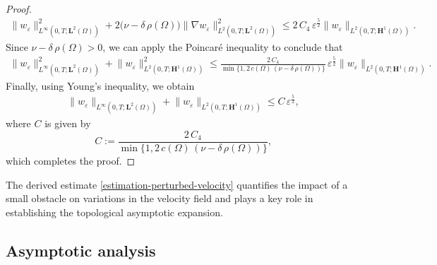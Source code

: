\documentclass[a4paper,12pt,reqno,natbib]{amsart}
\def\H{\textbf{H}}
\def\L{\textbf{L}}
\begin{document}
\begin{proof}
\begin{align*}
    \big\|w_\varepsilon\big\|^2_{L^\infty(0,T;\L^2(\Omega))}
    + 2\big(\nu - {\delta} \, \rho(\Omega)\big)
    \big\|\nabla w_\varepsilon\big\|^2_{L^2(0,T;\L^2(\Omega))}
    \leq 2\,C_4\,\varepsilon^{\frac{5}{2}} \big\|w_\varepsilon\big\|_{L^2(0,T;\H^1(\Omega))}.
\end{align*}
Since \( \nu - {\delta}\,\rho(\Omega) > 0 \), we can apply the Poincaré inequality to conclude that
\begin{align*}
    \big\|w_\varepsilon\big\|^2_{L^\infty(0,T;\L^2(\Omega))}
    + \big\| w_\varepsilon\big\|^2_{L^2(0,T;\H^1(\Omega))}
    \leq \frac{2\,C_4}{\min\{1, 2\,c(\Omega)\,(\nu - {\delta} \, \rho(\Omega))\}}\,\varepsilon^{\frac{5}{2}} 
    \big\|w_\varepsilon\big\|_{L^2(0,T;\H^1(\Omega))}.
\end{align*}
Finally, using Young's inequality, we obtain 
\begin{align*}
    \big\|w_\varepsilon\big\|_{L^\infty(0,T;\L^2(\Omega))}
    + \big\| w_\varepsilon\big\|_{L^2(0,T;\H^1(\Omega))}
    \leq C\,\varepsilon^{\frac{5}{2}},
\end{align*}
where \( C \) is given by
\[
C := \frac{2\,C_4}{\min\{1, 2\, c(\Omega)\,(\nu - {\delta} \, \rho(\Omega))\}},
\]
which completes the proof.
\end{proof}


The derived estimate \eqref{estimation-perturbed-velocity} quantifies the impact of a small obstacle on variations in the velocity field and plays a key role in establishing the topological asymptotic expansion.





\subsection{Asymptotic analysis}
\end{document}
